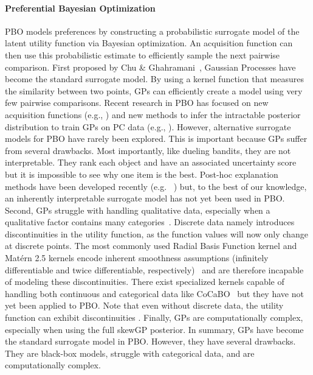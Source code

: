 \documentclass{article}
\begin{document}
\paragraph{Preferential Bayesian Optimization} PBO models preferences by constructing a probabilistic surrogate model of the latent utility function via Bayesian optimization. An acquisition function can then use this probabilistic estimate to efficiently sample the next pairwise comparison. First proposed by Chu \& Ghahramani~\cite{chu2005preference}, Gaussian Processes have become the standard surrogate model. By using a kernel function that measures the similarity between two points, GPs can efficiently create a model using very few pairwise comparisons. Recent research in PBO has focused on new acquisition functions (e.g., \cite{PBO2017, fauvel2021efficient, astudillo2023qeubodecisiontheoreticacquisitionfunction}) and new methods to infer the intractable posterior distribution to train GPs on PC data (e.g., \cite{Nielsen2015, siivola_preferential_2021, benavoli2021preferential, takeno2023towards}). However, alternative surrogate models for PBO have rarely been explored. This is important because GPs suffer from several drawbacks. Most importantly, like dueling bandits, they are not interpretable. They rank each object and have an associated uncertainty score but it is impossible to see why one item is the best. Post-hoc explanation methods have been developed recently (e.g. ~\cite{Chakraborty2026, gutierrez2024explainable,rodemann2025explaining}) but, to the best of our knowledge, an inherently interpretable surrogate model has not yet been used in PBO. Second, GPs struggle with handling qualitative data, especially when a qualitative factor contains many categories~\cite{Lin19102024}. Discrete data namely introduces discontinuities in the utility function, as the function values will now only change at discrete points. The most commonly used Radial Basis Function kernel and Matérn 2.5 kernels encode inherent smoothness assumptions (infinitely differentiable and twice differentiable, respectively)~\cite{williams2006gaussian} and are therefore incapable of modeling these discontinuities. There exist specialized kernels capable of handling both continuous and categorical data like CoCaBO~\cite{ru2020bayesian} but they have not yet been applied to PBO. Note that even without discrete data, the utility function can exhibit discontinuities \cite{gilboa2020consumption}. Finally, GPs are computationally complex, especially when using the full skewGP posterior. In summary, GPs have become the standard surrogate model in PBO. However, they have several drawbacks. They are black-box models, struggle with categorical data, and are computationally complex.
\end{document}
